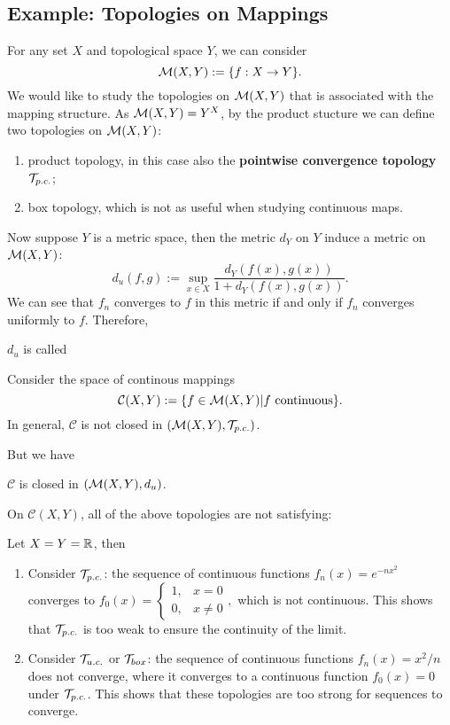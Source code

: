 \subsection{Example: Topologies on Mappings}
\label{subsec: toplogies on mappings 1}
For any set $X$ and topological space $Y$, we can consider 
$$
\mathcal{M}(X,Y):=\{f:X\to Y\}.
$$
We would like to study the topologies on $\mathcal{M}(X,Y)$ that is associated with the mapping structure.
As $\mathcal{M}(X,Y)=Y^X$, by the product stucture we can define two topologies on $\mathcal{M}(X,Y)$:
\begin{enumerate}[label=(\roman*)]
    \item product topology, in this case also the \textbf{pointwise convergence topology} $\mathcal{T}_{p.c.}$;
    \item box topology, which is not as useful when studying continuous maps.
\end{enumerate}


Now suppose $Y$ is a metric space, then the metric $d_Y$ on $Y$ induce a metric on $\mathcal{M}(X,Y)$:
$$d_u(f,g):=\sup_{x\in X}\frac{d_Y(f(x),g(x))}{1+d_Y(f(x),g(x))}.$$
We can see that $f_n$ converges to $f$ in this metric if and only if $f_n$ converges uniformly to $f$.
Therefore,
\begin{definition}
    $d_u$ is called 
\end{definition}

Consider the space of continous mappings
$$
\mathcal{C}(X,Y):=\{f\in \mathcal{M}(X,Y)|f\text{ continuous}\}.
$$
In general, $\mathcal{C}$ is not closed in $(\mathcal{M}(X,Y),\mathcal{T}_{p.c.})$.
\begin{example}
    
\end{example}
But we have 
\begin{proposition}
    $\mathcal{C}$ is closed in $(\mathcal{M}(X,Y),d_u)$.
\end{proposition}

On $\mathcal{C}(X,Y)$, all of the above topologies are not satisfying:
\begin{example}
    Let $X=Y=\mathbb{R}$, then 
    \begin{enumerate}
        \item Consider $\mathcal{T}_{p.c.}$: the sequence of continuous functions $f_n(x)=e^{-nx^2}$ converges to $f_0(x)=\left\{\begin{matrix}
            1, & x=0\\
            0, & x\neq 0
           \end{matrix}\right.,$ which is not continuous. This shows that $\mathcal{T}_{p.c.}$ is too weak to ensure the continuity of the limit.
        \item Consider $\mathcal{T}_{u.c.}$ or $\mathcal{T}_{box}$: the sequence of continuous functions $f_n(x)=x^2/n$ does not converge, where it converges to a 
        continuous function $f_0(x)=0$ under $\mathcal{T}_{p.c.}$. This shows that these topologies are too strong for sequences to converge.
    \end{enumerate}
\end{example}

